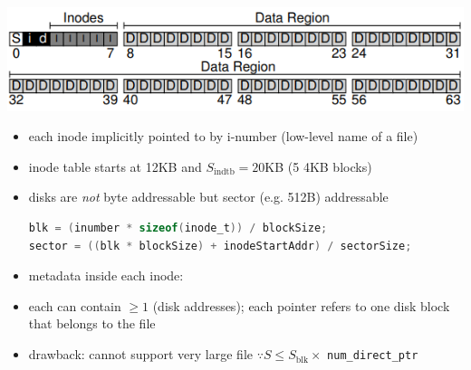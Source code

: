 \includegraphics[width=\linewidth]{imgs/fs_simple_blocks2}
\begin{itemize}
\item each inode implicitly pointed to by i-number (low-level name of a file)
\item inode table starts at 12KB and $S_{\text{indtb}} = 20$KB (5 4KB blocks)
\item disks are \emph{not} byte addressable but sector (e.g. 512B) addressable
\begin{lstlisting}[language=c,framextopmargin=-2pt,framexbottommargin=-2pt]
blk = (inumber * sizeof(inode_t)) / blockSize;
sector = ((blk * blockSize) + inodeStartAddr) / sectorSize;
\end{lstlisting}
\item metadata inside each inode:
\item each  can contain $\geq 1$  (disk addresses); each pointer refers to one disk block that belongs to the file
\item drawback: cannot support very large file $\because S \leq S_{\text{blk}} \times$ \texttt{num\_direct\_ptr}
\end{itemize}
